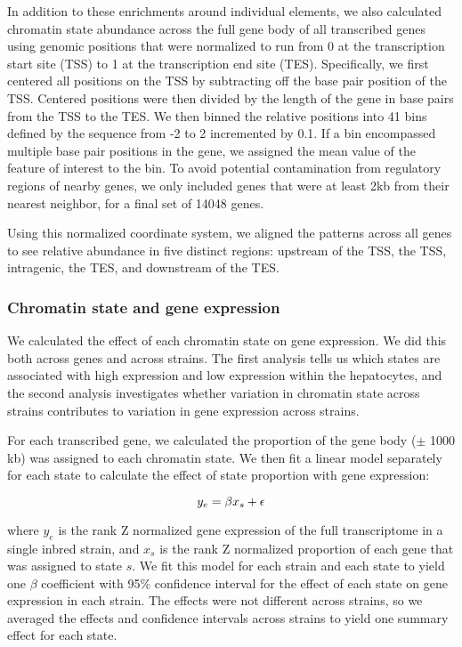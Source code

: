 \documentclass[10pt,letterpaper]{article}
\begin{document}
In addition to these enrichments around individual elements, we also
calculated chromatin state abundance across the full gene body of all
transcribed genes using genomic positions that were normalized to run
from 0 at the transcription start site (TSS) to 1 at the transcription
end site (TES). Specifically, we first centered all positions on the TSS
by subtracting off the base pair position of the TSS. Centered positions
were then divided by the length of the gene in base pairs from the TSS
to the TES. We then binned the relative positions into 41 bins defined
by the sequence from -2 to 2 incremented by 0.1. If a bin encompassed
multiple base pair positions in the gene, we assigned the mean value of
the feature of interest to the bin. To avoid potential contamination
from regulatory regions of nearby genes, we only included genes that
were at least 2kb from their nearest neighbor, for a final set of 14048
genes.

Using this normalized coordinate system, we aligned the patterns across
all genes to see relative abundance in five distinct regions: upstream
of the TSS, the TSS, intragenic, the TES, and downstream of the TES.

\hypertarget{chromatin-state-and-gene-expression}{%
\subsubsection{Chromatin state and gene
expression}\label{chromatin-state-and-gene-expression}}

We calculated the effect of each chromatin state on gene expression. We
did this both across genes and across strains. The first analysis tells
us which states are associated with high expression and low expression
within the hepatocytes, and the second analysis investigates whether
variation in chromatin state across strains contributes to variation in
gene expression across strains.

For each transcribed gene, we calculated the proportion of the gene body
(\(\pm\) 1000 kb) was assigned to each chromatin state. We then fit a
linear model separately for each state to calculate the effect of state
proportion with gene expression:

\begin{equation*}{\label{eqn:chromatin_effect}}
y_{e} = \beta x_{s} + \epsilon
\end{equation*}

where \(y_{e}\) is the rank Z normalized gene expression of the full
transcriptome in a single inbred strain, and \(x_{s}\) is the rank Z
normalized proportion of each gene that was assigned to state \(s\). We
fit this model for each strain and each state to yield one \(\beta\)
coefficient with 95\% confidence interval for the effect of each state
on gene expression in each strain. The effects were not different across
strains, so we averaged the effects and confidence intervals across
strains to yield one summary effect for each state.
\end{document}
